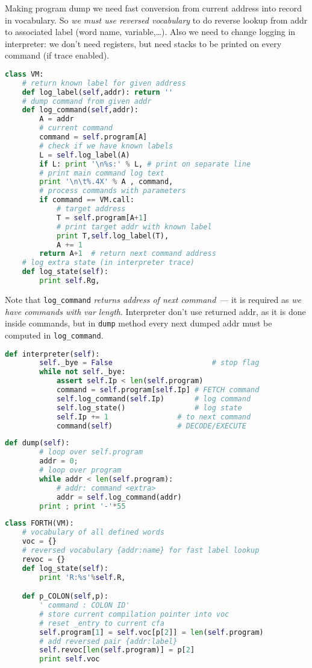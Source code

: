 Making program dump we need fast conversion from current address into record in
vocabulary. So \emph{we must use reversed vocabulary} to do reverse lookup from
addr to associated label (word name, variable,\ldots).
Also we need to change logging in interpreter: we don't need registers, but
need stacks to be printed on every command (if trace enabled).
\begin{lstlisting}[language=Python]
class VM:
	# return known label for given address
	def log_label(self,addr): return ''
	# dump command from given addr
	def log_command(self,addr):
		A = addr
		# current command
		command = self.program[A]
		# check if we have known labels
		L = self.log_label(A)
		if L: print '\n%s:' % L, # print on separate line
		# print main command log text
		print '\n\t%.4X' % A , command,
		# process commands with parameters
		if command == VM.call:
			# target address
			T = self.program[A+1]
			# print target addr with known label
			print T,self.log_label(T),
			A += 1
		return A+1	# return next command address
	# log extra state (in interpreter trace)
	def log_state(self):
		print self.Rg,
\end{lstlisting}
Note that \verb|log_command| \emph{returns address of next command}\ --- it is
required as \emph{we have commands with var length}. Interpreter don't use
returned addr, as it is done inside commands, but in \verb|dump| method every
next dumped addr must be computed in
\verb|log_command|.
\begin{lstlisting}[language=Python]
	def interpreter(self):
		self._bye = False		   				# stop flag
		while not self._bye:
			assert self.Ip < len(self.program)
			command = self.program[self.Ip]	# FETCH command
			self.log_command(self.Ip)		# log command
			self.log_state()				# log state
			self.Ip += 1				# to next command
			command(self)				# DECODE/EXECUTE
\end{lstlisting}
\begin{lstlisting}[language=Python]
   	def dump(self):
 		# loop over self.program
 		addr = 0;
 		# loop over program 
 		while addr < len(self.program):
 			# addr: command <extra>
 			addr = self.log_command(addr)
   		print ; print '-'*55
\end{lstlisting}
\begin{lstlisting}[language=Python]
class FORTH(VM):
	# vocabulary of all defined words
	voc = {}
	# reversed vocabulary {addr:name} for fast label lookup
	revoc = {}
	def log_state(self):
		print 'R:%s'%self.R,

  	def p_COLON(self,p):
  		' command : COLON ID'
  		# store current compilation pointer into voc
		# reset _entry to current cfa
  		self.program[1] = self.voc[p[2]] = len(self.program)
  		# add reversed pair {addr:label}
  		self.revoc[len(self.program)] = p[2]
		print self.voc
\end{lstlisting}

